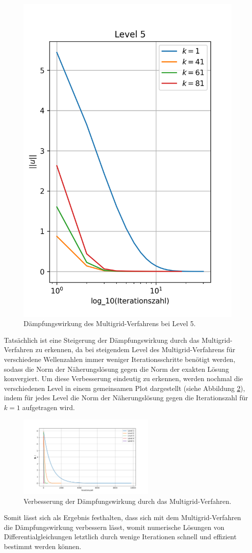 \documentclass[11pt,a4paper]{article}
\begin{document}
\begin{figure}[htbp]
    \centering
    \includegraphics[width=0.5\linewidth]{h1_level5}
    \caption[Dämpfungswirkung des Multigrid-Verfahrens bei Level 5.]{Dämpfungswirkung des Multigrid-Verfahrens bei Level 5.}\label{fig:h1_level5}
\end{figure} Tatsächlich ist eine Steigerung der Dämpfungswirkung durch das Multigrid-Verfahren zu erkennen, da bei steigendem Level des Multigrid-Verfahrens für verschiedene Wellenzahlen immer weniger Iterationsschritte benötigt werden, sodass die Norm der Näherungslösung
gegen die Norm der exakten Lösung konvergiert. Um diese Verbesserung eindeutig zu erkennen, werden nochmal die verschiedenen Level in einem gemeinsamen Plot dargestellt (siehe Abbildung \ref{fig:h1_level_comparison}), indem für jedes Level die Norm der Näherungslösung gegen die Iterationszahl für $k = 1$ aufgetragen wird.
\begin{figure}[htbp]
    \centering
    \includegraphics[width=0.6\textwidth,scale=0.7]{h1_level_comparison}
    \caption[Verbesserung der Dämpfungswirkung durch das Multigrid-Verfahren.]{Verbesserung der Dämpfungswirkung durch das Multigrid-Verfahren.}\label{fig:h1_level_comparison}
\end{figure} Somit lässt sich als Ergebnis festhalten, dass sich mit dem Multigrid-Verfahren die Dämpfungswirkung verbessern lässt, womit numerische Lösungen von Differentialgleichungen letztlich durch wenige Iterationen schnell und effizient bestimmt werden können.\newpage
\end{document}
